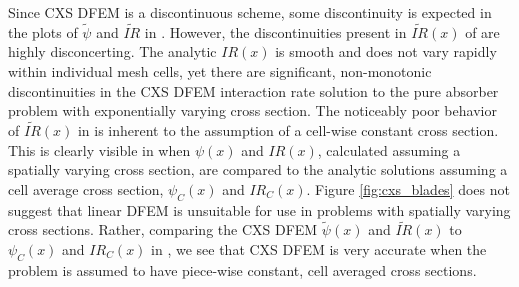 
Since CXS DFEM is a discontinuous scheme, some discontinuity is expected in the plots of $\widetilde{\psi}$ and $\widetilde{IR}$ in . 
However, the discontinuities present in $\widetilde{IR}(x)$ of  are highly disconcerting.
The analytic $IR(x)$ is smooth and does not vary rapidly within individual mesh cells, yet there are significant, non-monotonic discontinuities in the CXS DFEM interaction rate solution to the pure absorber problem with exponentially varying cross section.
The noticeably poor behavior of $\widetilde{IR}(x)$ in  is inherent to the assumption of a cell-wise constant cross section.
This is clearly visible in  when $\psi(x)$ and $IR(x)$, calculated assuming a spatially varying cross section, are compared to the analytic solutions assuming a cell average cross section, $\psi_C(x)$ and $IR_C(x)$. 
Figure \ref{fig:cxs_blades} does not suggest that linear DFEM is unsuitable for use in problems with spatially varying cross sections. 
Rather, comparing the CXS DFEM $\widetilde{\psi}(x)$ and $\widetilde{IR}(x)$ to $\psi_C(x)$ and $IR_C(x)$ in , we see that CXS DFEM  is very accurate when the problem is assumed to have piece-wise constant, cell averaged cross sections.

